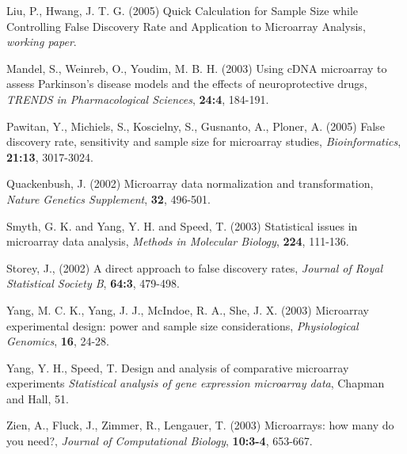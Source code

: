 \documentclass[12pt]{article}
\begin{document}
\begin{thebibliography}{}
 Liu, P., Hwang, J. T. G. (2005)
  Quick Calculation for Sample Size while Controlling False Discovery Rate and Application to Microarray Analysis,
  {\it working paper}.

 Mandel, S.,  Weinreb,
  O., Youdim, M. B. H. (2003) Using cDNA microarray to assess
  Parkinson's disease models and the effects of neuroprotective
  drugs, {\it TRENDS in Pharmacological Sciences}, {\bf 24:4},
  184-191.

 Pawitan, Y., Michiels, S., Koscielny, S., Gusnanto, A., Ploner, A. (2005)
  False discovery rate, sensitivity and sample size for microarray studies,
  {\it Bioinformatics}, {\bf 21:13}, 3017-3024.

 Quackenbush, J. (2002)
  Microarray data normalization and transformation, {\it Nature Genetics Supplement}, {\bf 32}, 496-501.

 Smyth, G. K. and Yang, Y. H. and Speed, T. (2003)
  Statistical issues in microarray data analysis, {\it Methods in Molecular Biology}, {\bf 224}, 111-136.

 Storey, J., (2002)
  A direct approach to false discovery rates, {\it Journal of Royal
  Statistical Society B}, {\bf 64:3}, 479-498.

 Yang, M. C. K., Yang,
  J. J., McIndoe, R. A., She, J. X. (2003) Microarray experimental
  design: power and sample size considerations, {\it Physiological
  Genomics}, {\bf 16}, 24-28.

 Yang, Y. H., Speed, T.
  {Design and analysis of comparative microarray experiments \it
  Statistical analysis of gene expression microarray data}, {Chapman
  and Hall}, 51.

 Zien, A., Fluck, J.,
  Zimmer, R., Lengauer, T. (2003) Microarrays: how many do you
  need?, {\it Journal of Computational Biology}, {\bf 10:3-4},
  653-667.

\end{thebibliography}
\end{document}
